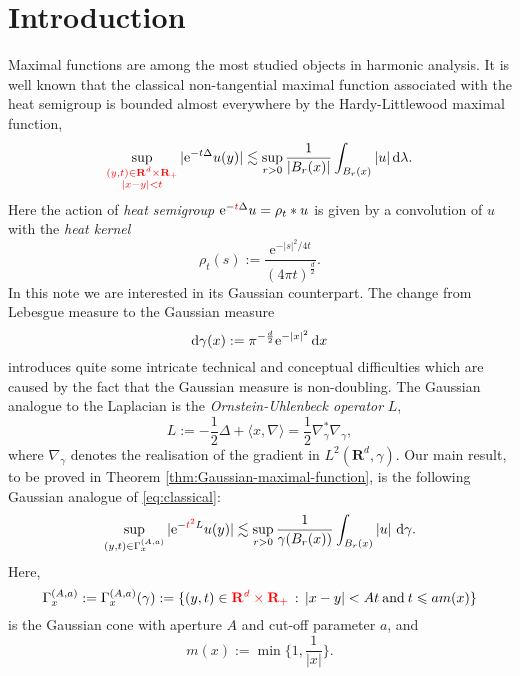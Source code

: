 \documentclass{amsart}
\theoremstyle{remark}
\newcommand{\D}{\,\textup{d}}
\newcommand{\la}{\langle}
\newcommand{\ra}{\rangle}
\renewcommand{\leq}{\leqslant}
\renewcommand{\leq}{\leqslant}
\newcommand{\R}{\mathbf R}
\newcommand{\e}{\mathrm{e}} %
\renewcommand{\leq}{\leqslant}%
\newcommand{\red}{\color{red}}
\begin{document}
\section{Introduction}
Maximal functions are among the most studied objects in harmonic
analysis. 
It is well known that the classical {\red non-tangential} maximal
function associated with the heat semigroup is bounded almost everywhere
by the Hardy-Littlewood maximal function, 
\begin{equation}\label{eq:classical}
  \sup_{{\red \substack{(y, t) \in   \R^d \times \R_+\\ |x - y| < t}}} |\e^{-t \Delta} u(y)| \lesssim \sup_{r
    > 0}  \frac1{|B_r(x)|}\int_{B_r(x)} |u| \D\lambda.
\end{equation}
Here
the action of \emph{heat semigroup} $\e^{-{\red t} \Delta} u = \rho_t \ast u$ is
given by a convolution of $u$ with the \emph{heat kernel}
\begin{equation*}
  \rho_t(s) := \frac{\e^{-|s|^2/4t}}{(4\pi t)^{\frac{d}2}}.
\end{equation*}
In this note we are interested in its Gaussian counterpart. 
The change from Lebesgue measure to the Gaussian measure
\begin{equation}
  \label{eq:Gaussian-measure}
  \mathrm{d}\gamma(x) := \pi^{-\frac{d}2} \e^{-|x|^2} \D{x}
\end{equation}
introduces quite
some intricate technical and conceptual difficulties which are caused 
by the fact that the Gaussian measure is non-doubling.
The Gaussian analogue to the Laplacian is the
\emph{Ornstein-Uhlenbeck operator} $L$,
\begin{equation}
  \label{eq:Ornstein-Uhlenbeck-operator}
  L := -\frac12 \Delta + \la x, \nabla \ra = \frac12 \nabla_\gamma^* \nabla_\gamma,
\end{equation}
where $\nabla_\gamma$ denotes the realisation of the gradient in $L^2(\R^d,\gamma)$.
Our main result, to be proved in Theorem \ref{thm:Gaussian-maximal-function}, is the 
following Gaussian analogue of \eqref{eq:classical}:
\begin{equation}\label{eq:main}
  \sup_{(y, t) \in \Gamma_x^{(A, a)}} |\e^{-{\red t^2} L} u(y)| \lesssim
  \sup_{r > 0} \frac1{\gamma(B_r(x))}\int_{B_r(x)} |u| \, \D\gamma.
\end{equation}
Here, 
\begin{equation}
  \label{eq:Gaussian-cone}
  \Gamma_x^{(A, a)} := \Gamma_x^{(A, a)}(\gamma) := \{(y, t) \in
  {\red \R^d\times \R_+}  \,: \, |x - y| < At \:\text{and}\: t \leq a m(x)\}
\end{equation}
 is the Gaussian cone with aperture $A$ and cut-off parameter $a$, and 
\begin{equation}\label{eq:m-function}
  m(x) := \min\biggl\{1, \frac1{|x|} \biggr\}. %
\end{equation}
\end{document}
